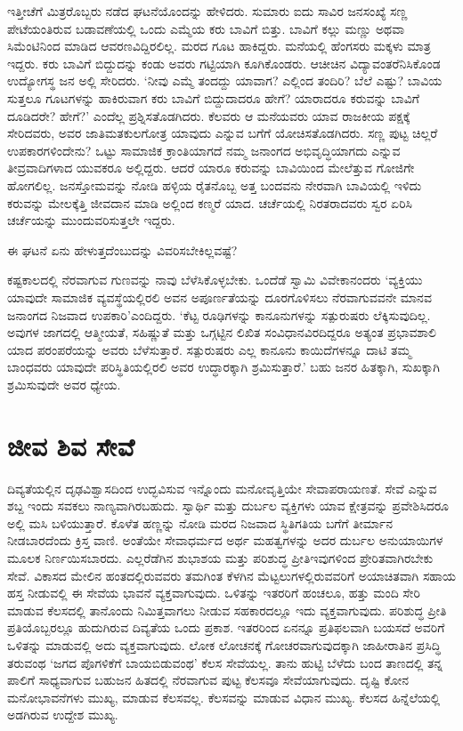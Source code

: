 
ಇತ್ತೀಚೆಗೆ ಮಿತ್ರರೊಬ್ಬರು ನಡೆದ ಘಟನೆಯೊಂದನ್ನು ಹೇಳಿದರು. ಸುಮಾರು ಐದು ಸಾವಿರ ಜನಸಂಖ್ಯೆ ಸಣ್ಣ ಪೇಟೆಯಂತಿರುವ ಬಡಾವಣೆಯಲ್ಲಿ ಒಂದು ಎಮ್ಮೆಯ ಕರು ಬಾವಿಗೆ ಬಿತ್ತು. ಬಾವಿಗೆ ಕಲ್ಲು ಮಣ್ಣು ಅಥವಾ ಸಿಮೆಂಟಿನಿಂದ ಮಾಡಿದ ಆವರಣವಿದ್ದಿರಲಿಲ್ಲ. ಮರದ ಗೂಟ ಹಾಕಿದ್ದರು. ಮನೆಯಲ್ಲಿ ಹೆಂಗಸರು ಮಕ್ಕಳು ಮಾತ್ರ ಇದ್ದರು. ಕರು ಬಾವಿಗೆ ಬಿದ್ದುದನ್ನು ಕಂಡು ಅವರು ಗಟ್ಟಿಯಾಗಿ ಕೂಗಿಕೊಂಡರು. ಆಚೀಚಿನ ವಿದ್ಯಾವಂತರೆನಿಸಿಕೊಂಡ ಉದ್ಯೋಗಸ್ಥ ಜನ ಅಲ್ಲಿ ಸೇರಿದರು. ‘ನೀವು ಎಮ್ಮೆ ತಂದದ್ದು ಯಾವಾಗ? ಎಲ್ಲಿಂದ ತಂದಿರಿ? ಬೆಲೆ ಎಷ್ಟು? ಬಾವಿಯ ಸುತ್ತಲೂ ಗೂಟಗಳನ್ನು ಹಾಕಿರುವಾಗ ಕರು ಬಾವಿಗೆ ಬಿದ್ದುದಾದರೂ ಹೇಗೆ? ಯಾರಾದರೂ ಕರುವನ್ನು ಬಾವಿಗೆ ದೂಡಿದರೇ? ಹೇಗೆ?’ ಎಂದೆಲ್ಲ ಪ್ರಶ್ನಿಸತೊಡಗಿದರು. ಕೆಲವರು ಆ ಮನೆಯವರು ಯಾವ ರಾಜಕೀಯ ಪಕ್ಷಕ್ಕೆ ಸೇರಿದವರು, ಅವರ ಜಾತಿಮತಕುಲಗೋತ್ರ ಯಾವುದು ಎನ್ನುವ ಬಗೆಗೆ ಯೋಚಿಸತೊಡಗಿದರು. ಸಣ್ಣ ಪುಟ್ಟ ಚಿಲ್ಲರೆ ಉಪಕಾರಗಳಿಂದೇನು? ಒಟ್ಟು ಸಾಮಾಜಿಕ ಕ್ರಾಂತಿಯಾಗದೆ ನಮ್ಮ ಜನಾಂಗದ ಅಭಿವೃದ್ಧಿಯಾಗದು ಎನ್ನುವ ತೀವ್ರವಾದಿಗಳಾದ ಯುವಕರೂ ಅಲ್ಲಿದ್ದರು. ಆದರೆ ಯಾರೂ ಕರುವನ್ನು ಬಾವಿಯಿಂದ ಮೇಲೆತ್ತುವ ಗೋಜಿಗೇ ಹೋಗಲಿಲ್ಲ. ಜನಸ್ತೋಮವನ್ನು ನೋಡಿ ಹಳ್ಳಿಯ ರೈತನೊಬ್ಬ ಅತ್ತ ಬಂದವನು ನೇರವಾಗಿ ಬಾವಿಯಲ್ಲಿ ಇಳಿದು ಕರುವನ್ನು ಮೇಲಕ್ಕೆತ್ತಿ ಜೀವದಾನ ಮಾಡಿ ಅಲ್ಲಿಂದ ಕಣ್ಮರೆ ಯಾದ. ಚರ್ಚೆಯಲ್ಲಿ ನಿರತರಾದವರು ಸ್ವರ ಏರಿಸಿ ಚರ್ಚೆಯನ್ನು ಮುಂದುವರಿಸುತ್ತಲೇ ಇದ್ದರು.

ಈ ಘಟನೆ ಏನು ಹೇಳುತ್ತದೆಂಬುದನ್ನು ವಿವರಿಸಬೇಕಿಲ್ಲವಷ್ಟೆ?

ಕಷ್ಟಕಾಲದಲ್ಲಿ ನೆರವಾಗುವ ಗುಣವನ್ನು ನಾವು ಬೆಳೆಸಿಕೊಳ್ಳಬೇಕು. ಒಂದೆಡೆ ಸ್ವಾಮಿ ವಿವೇಕಾನಂದರು ‘ವ್ಯಕ್ತಿಯು ಯಾವುದೇ ಸಾಮಾಜಿಕ ವ್ಯವಸ್ಥೆಯಲ್ಲಿರಲಿ ಅವನ ಅಪೂರ್ಣತೆಯನ್ನು ದೂರಗೊಳಿಸಲು ನೆರವಾಗುವವನೇ ಮಾನವ ಜನಾಂಗದ ನಿಜವಾದ ಉಪಕಾರಿ’\break ಎಂದಿದ್ದರು. ‘ಕೆಟ್ಟ ರೂಢಿಗಳನ್ನು ಕಾನೂನುಗಳನ್ನು ಸತ್ಪುರುಷರು ಲೆಕ್ಕಿಸುವುದಿಲ್ಲ. ಅವುಗಳ ಜಾಗದಲ್ಲಿ ಆತ್ಮೀಯತೆ, ಸಹಿಷ್ಣುತೆ ಮತ್ತು ಒಗ್ಗಟ್ಟಿನ ಲಿಖಿತ ಸಂವಿಧಾನವಿರದಿದ್ದರೂ ಅತ್ಯಂತ ಪ್ರಭಾವಶಾಲಿ ಯಾದ ಪರಂಪರೆಯನ್ನು ಅವರು ಬೆಳೆಸುತ್ತಾರೆ. ಸತ್ಪುರುಷರು ಎಲ್ಲ ಕಾನೂನು ಕಾಯಿದೆಗಳನ್ನೂ ದಾಟಿ ತಮ್ಮ ಬಾಂಧವರು ಯಾವುದೇ ಪರಿಸ್ಥಿತಿಯಲ್ಲಿರಲಿ ಅವರ ಉದ್ಧಾರಕ್ಕಾಗಿ ಶ್ರಮಿಸುತ್ತಾರೆ.’ ಬಹು ಜನರ ಹಿತಕ್ಕಾಗಿ, ಸುಖಕ್ಕಾಗಿ ಶ್ರಮಿಸುವುದೇ ಅವರ ಧ್ಯೇಯ.


\section*{ಜೀವ ಶಿವ ಸೇವೆ}


ದಿವ್ಯತೆಯಲ್ಲಿನ ದೃಢವಿಶ್ವಾಸದಿಂದ ಉದ್ಭವಿಸುವ ಇನ್ನೊಂದು ಮನೋವೃತ್ತಿಯೇ ಸೇವಾ\break ಪರಾಯಣತೆ. ಸೇವೆ ಎನ್ನುವ ಶಬ್ದ ಇಂದು ಸವಕಲು ನಾಣ್ಯವಾಗಿರಬಹುದು. ಸ್ವಾರ್ಥಿ ಮತ್ತು ದುರ್ಬಲ ವ್ಯಕ್ತಿಗಳು ಯಾವ ಕ್ಷೇತ್ರವನ್ನು ಪ್ರವೇಶಿಸಿದರೂ ಅಲ್ಲಿ ಮಸಿ ಬಳಿಯುತ್ತಾರೆ. ಕೊಳೆತ ಹಣ್ಣನ್ನು ನೋಡಿ ಮರದ ನಿಜವಾದ ಸ್ಥಿತಿಗತಿಯ ಬಗೆಗೆ ತೀರ್ಮಾನ ನೀಡಬಾರದೆಂದು ಕ್ರಿಸ್ತ ವಾಣಿ. ಅಂತೆಯೇ ಸೇವಾಧರ್ಮದ ಅರ್ಥ ಮಹತ್ವಗಳನ್ನು ಅದರ ದುರ್ಬಲ ಅನುಯಾಯಿಗಳ ಮೂಲಕ ನಿರ್ಣಯಿಸಬಾರದು. ಎಲ್ಲರೆಡೆಗಿನ ಶುಭಾಶಯ ಮತ್ತು ಪರಿಶುದ್ಧ ಪ್ರೀತಿ\break ಇವುಗಳಿಂದ ಪ್ರೇರಿತವಾಗಿರಬೇಕು ಸೇವೆ. ವಿಕಾಸದ ಮೇಲಿನ ಹಂತದಲ್ಲಿರುವವರು ತಮಗಿಂತ ಕೆಳಗಿನ ಮೆಟ್ಟಲುಗಳಲ್ಲಿರುವವರಿಗೆ ಅಯಾಚಿತವಾಗಿ ಸಹಾಯ ಹಸ್ತ ನೀಡುವಲ್ಲಿ ಈ ಸೇವೆಯ ಭಾವನೆ ವ್ಯಕ್ತವಾಗುವುದು. ಒಳಿತನ್ನು ಇತರರಿಗೆ ಹಂಚಲೂ, ಹತ್ತು ಮಂದಿ ಸೇರಿ ಮಾಡುವ ಕೆಲಸದಲ್ಲಿ ತಾನೊಂದು ನಿಮಿತ್ತವಾಗಲು ನೀಡುವ ಸಹಕಾರದಲ್ಲೂ ಇದು ವ್ಯಕ್ತವಾಗುವುದು. ಪರಿಶುದ್ಧ ಪ್ರೀತಿ ಪ್ರತಿಯೊಬ್ಬರಲ್ಲೂ ಹುದುಗಿರುವ ದಿವ್ಯತೆಯ ಒಂದು ಪ್ರಕಾಶ. ಇತರರಿಂದ ಏನನ್ನೂ ಪ್ರತಿಫಲವಾಗಿ ಬಯಸದೆ ಅವರಿಗೆ ಒಳಿತನ್ನು ಮಾಡುವಲ್ಲಿ ಅದು ವ್ಯಕ್ತವಾಗುವುದು. ಲೋಕ ಲೋಚನಕ್ಕೆ ಗೋಚರವಾಗುವುದಕ್ಕಾಗಿ ಜಾಹೀರಾತಿನ ಪ್ರಸಿದ್ಧಿ ತರುವಂಥ ‘ಜಗದ ಪೊಗಳಿಕೆಗೆ ಬಾಯಬಿಡುವಂಥ’ ಕೆಲಸ ಸೇವೆಯಲ್ಲ. ತಾನು ಹುಟ್ಟಿ ಬೆಳೆದು ಬಂದ ತಾಣದಲ್ಲಿ ತನ್ನ ಪಾಲಿಗೆ ಸಾಧ್ಯವಾಗುವ ಬಹುಜನ ಹಿತದಲ್ಲಿ ನೆರವಾಗುವ ಪುಟ್ಟ ಕೆಲಸವೂ ಸೇವೆಯಾಗುವುದು. ದೃಷ್ಟಿ ಕೋನ ಮನೋಭಾವನೆಗಳು ಮುಖ್ಯ, ಮಾಡುವ ಕೆಲಸವಲ್ಲ. ಕೆಲಸವನ್ನು ಮಾಡುವ ವಿಧಾನ ಮುಖ್ಯ. ಕೆಲಸದ ಹಿನ್ನೆಲೆಯಲ್ಲಿ ಅಡಗಿರುವ ಉದ್ದೇಶ ಮುಖ್ಯ.

